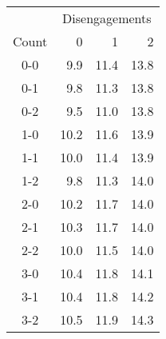 \begin{tabular}{c|rrr}
 & \multicolumn{3}{c}{Disengagements}\\
Count & 0 & 1 & 2 \\
  \hline
0-0 & 9.9 & 11.4 & 13.8 \\ 
  0-1 & 9.8 & 11.3 & 13.8 \\ 
  0-2 & 9.5 & 11.0 & 13.8 \\ 
  1-0 & 10.2 & 11.6 & 13.9 \\ 
  1-1 & 10.0 & 11.4 & 13.9 \\ 
  1-2 & 9.8 & 11.3 & 14.0 \\ 
  2-0 & 10.2 & 11.7 & 14.0 \\ 
  2-1 & 10.3 & 11.7 & 14.0 \\ 
  2-2 & 10.0 & 11.5 & 14.0 \\ 
  3-0 & 10.4 & 11.8 & 14.1 \\ 
  3-1 & 10.4 & 11.8 & 14.2 \\ 
  3-2 & 10.5 & 11.9 & 14.3 \\ 
\end{tabular}
